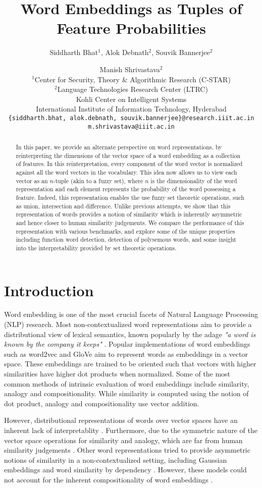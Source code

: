 \documentclass[11pt,a4paper]{article}
\title{Word Embeddings as Tuples of Feature Probabilities}
\author{Siddharth Bhat$^1$, Alok Debnath$^2$, Souvik Bannerjee$^2$ \and Manish Shrivastava$^2$\\
     $^1$Center for Security, Theory \& Algorithmic Research (C-STAR) \\
     $^2$Language Technologies Research Center (LTRC)\\                                
     Kohli Center on Intelligent Systems\\                                         
     International Institute of Information Technology, Hyderabad \\               
     {\small{\tt \{siddharth.bhat, alok.debnath, souvik.bannerjee\}@research.iiit.ac.in}} \\                                     
     {\small{\tt m.shrivastava@iiit.ac.in}  }                                             
}
\date{}
\begin{document}
\maketitle
\begin{abstract}
In this paper, we provide an alternate perspective on word representations, by reinterpreting the dimensions of the vector space of a word embedding as a collection of features. In this reinterpretation, every component of the word vector is normalized against all the word vectors in the vocabulary. This idea now allows us to view each vector as an $n$-tuple (akin to a fuzzy set), where $n$ is the dimensionality of the word representation and each element represents the probability of the word possessing a feature. Indeed, this representation enables the use fuzzy set theoretic operations, such as union, intersection and difference. Unlike previous attempts, we show that this representation of words provides a notion of similarity which is inherently asymmetric and hence closer to human similarity judgements. We compare the performance of this representation with various benchmarks, and explore some of the unique properties including function word detection, detection of polysemous words, and some insight into the interpretability provided by set theoretic operations.
\end{abstract}

\section{Introduction}
\label{sec: intro}

Word embedding is one of the most crucial facets of Natural Language Processing (NLP) research. Most non-contextualized word representations aim to provide a distributional view of lexical semantics, known popularly by the adage \textit{"a word is known by the company it keeps"} \citep{firth1957synopsis}. Popular implementations of word embeddings such as word2vec \citep{mikolov2013efficient} and GloVe \citep{pennington2014glove} aim to represent words as embeddings in a vector space. These embeddings are trained to be oriented such that vectors with higher similarities have higher dot products when normalized. Some of the most common methods of intrinsic evaluation of word embeddings include similarity, analogy and compositionality. While similarity is computed using the notion of dot product, analogy and compositionality use vector addition.

However, distributional representations of words over vector spaces have an inherent lack of interpretablity \citep{goldberg2014word2vec}. Furthermore, due to the symmetric nature of the vector space operations for similarity and analogy, which are far from human similarity judgements \citep{tversky1977features}. Other word representations tried to provide asymmetric notions of similarity in a non-contextualized setting, including Gaussian embeddings \citep{vilnis2014word} and word similarity by dependency \citep{gawron2014improving}. However, these models could not account for the inherent compositionality of word embeddings \citep{mikolov2013distributed}. 
\end{document}
